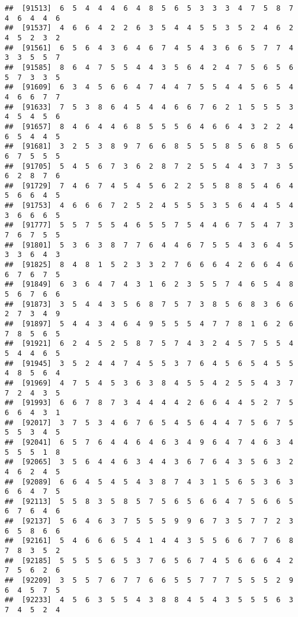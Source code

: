 \documentclass[
]{book}
\begin{document}
\begin{verbatim}
##  [91513]  6  5  4  4  4  6  4  8  5  6  5  3  3  3  4  7  5  8  7  4  6  4  4  6
##  [91537]  4  6  6  4  2  2  6  3  5  4  4  5  5  3  5  2  4  6  2  4  5  2  3  2
##  [91561]  6  5  6  4  3  6  4  6  7  4  5  4  3  6  6  5  7  7  4  3  3  5  5  7
##  [91585]  8  6  4  7  5  5  4  4  3  5  6  4  2  4  7  5  6  5  6  5  7  3  3  5
##  [91609]  6  3  4  5  6  6  4  7  4  4  7  5  5  4  4  5  6  5  4  4  6  6  7  7
##  [91633]  7  5  3  8  6  4  5  4  4  6  6  7  6  2  1  5  5  5  3  4  5  4  5  6
##  [91657]  8  4  6  4  4  6  8  5  5  5  6  4  6  6  4  3  2  2  4  6  5  4  4  5
##  [91681]  3  2  5  3  8  9  7  6  6  8  5  5  5  8  5  6  8  5  6  6  7  5  5  5
##  [91705]  5  4  5  6  7  3  6  2  8  7  2  5  5  4  4  3  7  3  5  6  2  8  7  6
##  [91729]  7  4  6  7  4  5  4  5  6  2  2  5  5  8  8  5  4  6  4  5  6  6  4  5
##  [91753]  4  6  6  6  7  2  5  2  4  5  5  5  3  5  6  4  4  5  4  3  6  6  6  5
##  [91777]  5  5  7  5  5  4  6  5  5  7  5  4  4  6  7  5  4  7  3  7  6  7  5  5
##  [91801]  5  3  6  3  8  7  7  6  4  4  6  7  5  5  4  3  6  4  5  3  3  6  4  3
##  [91825]  8  4  8  1  5  2  3  3  2  7  6  6  6  4  2  6  6  4  6  6  7  6  7  5
##  [91849]  6  3  6  4  7  4  3  1  6  2  3  5  5  7  4  6  5  4  8  5  6  7  6  6
##  [91873]  3  5  4  4  3  5  6  8  7  5  7  3  8  5  6  8  3  6  6  2  7  3  4  9
##  [91897]  5  4  4  3  4  6  4  9  5  5  5  4  7  7  8  1  6  2  6  7  8  5  6  5
##  [91921]  6  2  4  5  2  5  8  7  5  7  4  3  2  4  5  7  5  5  4  5  4  4  6  5
##  [91945]  3  5  2  4  4  7  4  5  5  3  7  6  4  5  6  5  4  5  5  4  8  5  6  4
##  [91969]  4  7  5  4  5  3  6  3  8  4  5  5  4  2  5  5  4  3  7  7  2  4  3  5
##  [91993]  6  6  7  8  7  3  4  4  4  4  2  6  6  4  4  5  2  7  5  6  6  4  3  1
##  [92017]  3  7  5  3  4  6  7  6  5  4  5  6  4  4  7  5  6  7  5  5  5  3  4  5
##  [92041]  6  5  7  6  4  4  6  4  6  3  4  9  6  4  7  4  6  3  4  5  5  5  1  8
##  [92065]  3  5  6  4  4  6  3  4  4  3  6  7  6  4  3  5  6  3  2  4  6  2  4  5
##  [92089]  6  6  4  5  4  5  4  3  8  7  4  3  1  5  6  5  3  6  3  6  6  4  7  5
##  [92113]  5  5  8  3  5  8  5  7  5  6  5  6  6  4  7  5  6  6  5  6  7  6  4  6
##  [92137]  5  6  4  6  3  7  5  5  5  9  9  6  7  3  5  7  7  2  3  6  5  8  6  6
##  [92161]  5  4  6  6  6  5  4  1  4  4  3  5  5  6  6  7  7  6  8  7  8  3  5  2
##  [92185]  5  5  5  5  6  5  3  7  6  5  6  7  4  5  6  6  6  4  2  7  5  6  2  6
##  [92209]  3  5  5  7  6  7  7  6  6  5  5  7  7  7  5  5  5  2  9  6  4  5  7  5
##  [92233]  4  5  6  3  5  5  4  3  8  8  4  5  4  3  5  5  5  6  3  7  4  5  2  4

\end{verbatim}
\end{document}
